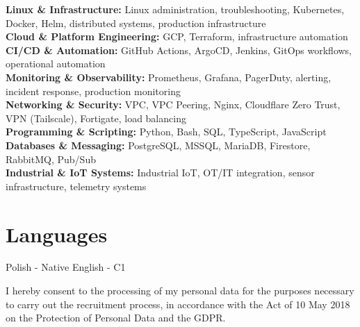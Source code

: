 \documentclass[11pt,a4paper]{article}
\begin{document}
	\textbf{Linux \& Infrastructure:} Linux administration, troubleshooting, Kubernetes, Docker, Helm, distributed systems, production infrastructure \\
	\textbf{Cloud \& Platform Engineering:} GCP, Terraform, infrastructure automation \\
	\textbf{CI/CD \& Automation:} GitHub Actions, ArgoCD, Jenkins, GitOps workflows, operational automation \\
	\textbf{Monitoring \& Observability:} Prometheus, Grafana, PagerDuty, alerting, incident response, production monitoring \\
	\textbf{Networking \& Security:} VPC, VPC Peering, Nginx, Cloudflare Zero Trust, VPN (Tailscale), Fortigate, load balancing \\
	\textbf{Programming \& Scripting:} Python, Bash, SQL, TypeScript, JavaScript \\
	\textbf{Databases \& Messaging:} PostgreSQL, MSSQL, MariaDB, Firestore, RabbitMQ, Pub/Sub \\
	\textbf{Industrial \& IoT Systems:} Industrial IoT, OT/IT integration, sensor infrastructure, telemetry systems
	
	\section{Languages}
	
	\noindent Polish - Native \quad\textbar\quad English - C1
	
	\vspace{\fill}
	\begin{center}
		\footnotesize\color{gray}
		I hereby consent to the processing of my personal data for the purposes necessary to carry out the recruitment process,
		in accordance with the Act of 10 May 2018 on the Protection of Personal Data and the GDPR.
	\end{center}
	
\end{document}
